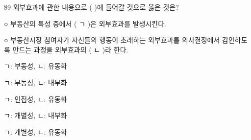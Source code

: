 \begin{question}{89}
외부효과에 관한 내용으로 ( )에 들어갈 것으로 옳은 것은?
\begin{framedtext}
○ 부동산의 특성 중에서 ( ㄱ )은 외부효과를 발생시킨다. \par
○ 부동산시장 참여자가 자신들의 행동이 초래하는 외부효과를 의사결정에서 감안하도록 만드는 과정을 외부효과의 ( ㄴ )라 한다. \par
\end{framedtext}
\begin{choices}
  \item ㄱ: 부동성, ㄴ: 유동화
  \item ㄱ: 부동성, ㄴ: 내부화
  \item ㄱ: 인접성, ㄴ: 유동화
  \item ㄱ: 개별성, ㄴ: 내부화
  \item ㄱ: 개별성, ㄴ: 유동화
\end{choices}
\end{question}
